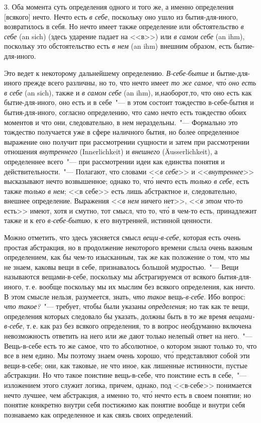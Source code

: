 3. Оба момента суть определения одного и того же, а
именно определения [всякого] нечто. Нечто есть \emph{в себе},
поскольку оно ушло из бытия-для-иного, возвратилось
в себя. Но нечто имеет также определение или обстоятельство
\emph{в себе} (an sich) (здесь ударение падает на <<в>>)
или \emph{в самом себе} (an ihm), поскольку это обстоятельство
есть \emph{в нем} (an ihm) внешним образом, есть бытие-для-иного.

Это ведет к некоторому дальнейшему определению.
\emph{В-себе-бытие} и бытие-для-иного прежде всего различны,
но то, что нечто имеет \emph{то же самое}, чт\'о \emph{оно есть в себе}
(an sich), также и \emph{в самом себе} (an ihm), и,наоборот,то,
что оно есть как бытие-для-иного, оно есть и в себе~"---
в этом состоит тождество в-себе-бытия и бытия-для-иного,
согласно определению, что само нечто есть тождество
обоих моментов и что они, следовательно, в нем нераздельны.~"---
Формально это тождество получается уже в
сфере наличного бытия, но более определенное выражение
оно получит при рассмотрении сущности и затем
при рассмотрении отношения \emph{внутреннего} (Innerlichkeit)
и \emph{внешнего} (Äusserlichkeit), а определеннее всего~"--- при
рассмотрении идеи как единства понятия и действительности.~"---
Полагают, что словами <<\emph{в себе}>> и <<\emph{внутреннее}>>
высказывают нечто возвышенное; однако то, чт\'о нечто
есть \emph{только в себе}, есть также \emph{только в нем}; <<в себе>>
есть лишь абстрактное и, следовательно, внешнее определение.
Выражения <<\emph{в нем} ничего нет>>, <<\emph{в этом} что-то
есть>> имеют, хотя и смутно, тот смысл, что то, чт\'о в чем-то
есть, принадлежит также и к его \emph{в-себе-бытию}, к его
внутренней, истинной ценности.

Можно отметить, что здесь уясняется смысл \emph{вещи-в-себе},
которая есть очень простая абстракция, но в продолжение
некоторого времени слыла очень важным определением,
как бы чем-то изысканным, так же как положение
о том, что мы не знаем, каковы вещи в себе,
признавалось большой мудростью.~"--- Вещи называются
вещами-в-себе, поскольку мы абстрагируемся от всякого
бытия-для-иного, т.\,е. вообще поскольку мы их мыслим
без всякого определения, как ничто. В этом смысле нельзя,
разумеется, знать, \emph{что такое} вещь-\emph{в-себе}. Ибо вопрос:
\emph{что такое?}~"--- требует, чтобы были указаны \emph{определения};
но так как те вещи, определения которых следовало бы
указать, должны быть в то же время \emph{вещами-в-себе}, т.\,е.
как раз без всякого определения, то в вопрос необдуманно
включена невозможность ответить на него или же
дают только нелепый ответ на него.~"--- Вещь-в-себе есть
то же самое, что то абсолютное, о котором знают только
то, что все в нем едино. Мы поэтому знаем очень хорошо,
чт\'о представляют собой эти вещи-в-себе; они, как
таковые, не что иное, как лишенные истинности, пустые
абстракции. Но что такое поистине вещь-в-себе, что поистине
есть в себе,~"--- изложением этого служит логика,
причем, однако, под <<в-себе>> понимается нечто лучшее,
чем абстракция, а именно то, чт\'о нечто есть в своем
понятии; но понятие конкретно внутри себя постижимо
как понятие вообще и внутри себя познаваемо как определенное
и как связь своих определений.

